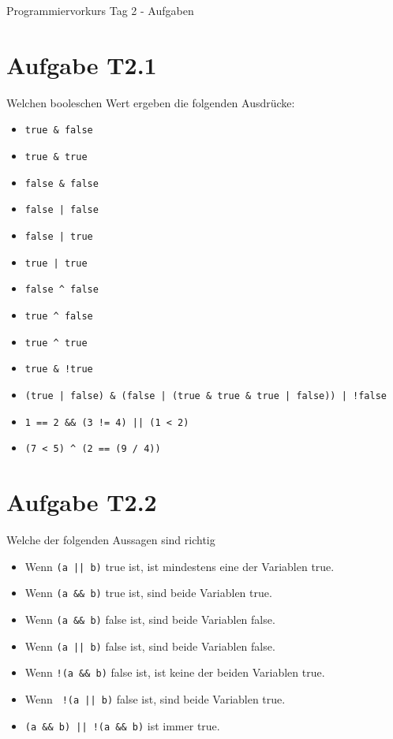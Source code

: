 \documentclass[final,a4paper]{article}
\begin{document}
\lstset{tabsize=4}
\lstset{basicstyle=\small}
\lstset{language=java}

{\huge Programmiervorkurs Tag 2 - Aufgaben}

\bigskip

\section*{Aufgabe T2.1}
	Welchen booleschen Wert ergeben die folgenden Ausdrücke:
	\begin{itemize}
		\item \lstinline{true & false}
		\item \lstinline{true & true}
		\item \lstinline{false & false}
		\item \lstinline{false | false}
		\item \lstinline{false | true}
		\item \lstinline{true | true}
		\item \lstinline{false ^ false}
		\item \lstinline{true ^ false}
		\item \lstinline{true ^ true}
		\item \lstinline{true & !true}
		\item \lstinline{(true | false) & (false | (true & true & true | false)) | !false}
		\item \lstinline{1 == 2 && (3 != 4) || (1 < 2)}
		\item \lstinline{(7 < 5) ^ (2 == (9 / 4))}
	\end{itemize}


\section*{Aufgabe T2.2}
Welche der folgenden Aussagen sind richtig
\begin{itemize}
\item Wenn \lstinline{(a || b)} true ist, ist mindestens eine der Variablen true.
\item Wenn \lstinline{(a && b)} true ist, sind beide Variablen true.
\item Wenn \lstinline{(a && b)} false ist, sind beide Variablen false.
\item Wenn \lstinline{(a || b)} false ist, sind beide Variablen false.
\item Wenn \lstinline{!(a && b)} false ist, ist keine der beiden Variablen true.
\item Wenn \lstinline{ !(a || b)} false ist, sind beide Variablen true.
\item \lstinline{(a && b) || !(a && b)} ist immer true.
\end{itemize}
\end{document}
